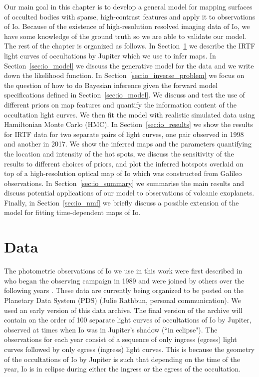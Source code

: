 \documentclass[12pt,dvipsnames]{report}
\begin{document}
Our main goal in this chapter is to develop a general model for mapping surfaces of 
occulted bodies with sparse, high-contrast features and apply it to observations of Io.
Because of the existence of high-resolution resolved imaging data of Io, we have some 
knowledge of the ground truth so we are able to validate our model.
The rest of the chapter is organized as follows.
In Section~\ref{sec:io_data} we describe the IRTF light curves of occultations by Jupiter 
which we use to infer maps.
In Section~\ref{sec:io_model} we discuss the generative model for the data and we write down 
the likelihood function.
In Section~\ref{sec:io_inverse_problem} we focus on the question of how to do Bayesian inference 
given the forward model specifications defined in Section~\ref{sec:io_model}.
We discuss and test the use of different priors on map features and quantify the 
information content of the occultation light curves. 
We then fit the model with realistic simulated data using Hamiltonian Monte Carlo (HMC).
In Section~\ref{sec:io_results} we show the results for IRTF data for two separate pairs of 
light curves, one pair observed in 1998 and another in 2017.
We show the inferred maps and the parameters quantifying the location and intensity of 
the hot spots, we discuss the sensitivity of the results to different choices of priors,
and plot the inferred hotspots overlaid on top of a high-resolution optical map of 
Io which was constructed from Galileo observations.
In Section~\ref{sec:io_summary} we summarise the main results and 
discuss potential applications of our model to observations of volcanic exoplanets.
Finally, in Section~\ref{sec:io_nmf} we briefly discuss a possible extension of the 
model for fitting time-dependent maps of Io.

\section{Data}
\label{sec:io_data}
The photometric observations of Io we use in this work were first described in 
\citet{1994Icar..107..195S} who began the observing campaign in 1989 and were joined 
by others over the following years 
\citep{1997GeoRL..24.2455S,2002GeoRL..29.1443R,2006GeoRL..3317201R,2010Icar..209..625R}. 
These data are currently being organized to be posted on the Planetary Data System (PDS) (Julie Rathbun, personal communication).  
We used an early version of this data archive.
The final version of the archive will contain on the order of 100 separate light 
curves of occultations of Io by Jupiter, observed at times when Io was in Jupiter's 
shadow (``in eclipse"). 
The observations for each year consist of a sequence of only ingress (egress) light 
curves followed by only egress (ingress) light curves. 
This is because the geometry of the occultations of Io by Jupiter is such that 
depending on the time of the year, Io is in eclipse during either the ingress or the 
egress of the occultation.
\end{document}
